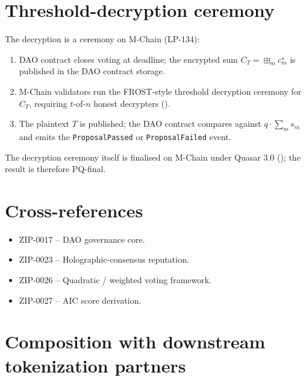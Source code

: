 \documentclass[11pt]{article}
\begin{document}
\section{Threshold-decryption ceremony}
\label{sec:thresh-dec}

The decryption is a ceremony on M-Chain (LP-134):

\begin{enumerate}[nosep]
  \item DAO contract closes voting at deadline; the encrypted
        sum $C_T = \boxplus_m c_m^\star$ is published in the DAO
        contract storage.
  \item M-Chain validators run the FROST-style threshold decryption
        ceremony for $C_T$, requiring $t$-of-$n$ honest decrypters
        (\cite{frost-lean}).
  \item The plaintext $T$ is published; the DAO contract compares
        against $q \cdot \sum_m s_m$ and emits the
        \texttt{ProposalPassed} or \texttt{ProposalFailed} event.
\end{enumerate}

The decryption ceremony itself is finalised on M-Chain under
Quasar 3.0 (\cite{quasar-cert}); the result is therefore
PQ-final.

\section{Cross-references}
\label{sec:cross}

\begin{itemize}[nosep]
  \item ZIP-0017 -- DAO governance core.
  \item ZIP-0023 -- Holographic-consensus reputation.
  \item ZIP-0026 -- Quadratic / weighted voting framework.
  \item ZIP-0027 -- AIC score derivation.
\end{itemize}

\section{Composition with downstream tokenization partners}
\label{sec:lp}
\end{document}
